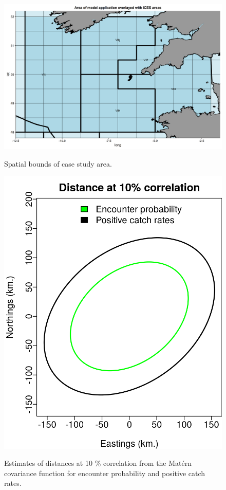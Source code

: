 \documentclass{article}
\begin{document}
\begin{figure}[!ht]
\begin{center}
	\includegraphics[width = 0.9\linewidth]{"figures/AreaMap"}
	\label{fig:S9}
	\caption{Spatial bounds of case study area.}
	\end{center}
\end{figure}

\begin{figure}[!ht]
\begin{center}
	\includegraphics[width = 0.9\linewidth]{"figures/Aniso"}
	\label{fig:S10}
	\caption{Estimates of distances at 10 \% correlation from the Matérn
		covariance function for encounter probability and positive
		catch rates.}
	\end{center}
\end{figure}
\end{document}
